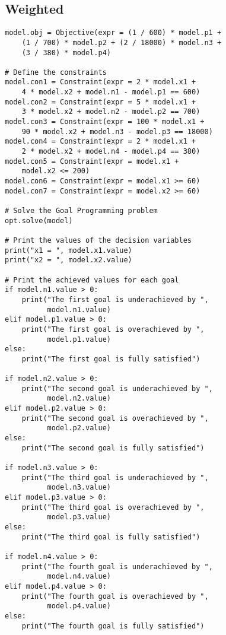 \documentclass[twoside,twocolumn]{article}
\begin{document}
\subsection{Weighted}

\blindtext %

\begin{lstlisting}
model.obj = Objective(expr = (1 / 600) * model.p1 +
    (1 / 700) * model.p2 + (2 / 18000) * model.n3 +
    (3 / 380) * model.p4)

# Define the constraints
model.con1 = Constraint(expr = 2 * model.x1 +
    4 * model.x2 + model.n1 - model.p1 == 600)
model.con2 = Constraint(expr = 5 * model.x1 +
    3 * model.x2 + model.n2 - model.p2 == 700)
model.con3 = Constraint(expr = 100 * model.x1 +
    90 * model.x2 + model.n3 - model.p3 == 18000)
model.con4 = Constraint(expr = 2 * model.x1 +
    2 * model.x2 + model.n4 - model.p4 == 380)
model.con5 = Constraint(expr = model.x1 +
    model.x2 <= 200)
model.con6 = Constraint(expr = model.x1 >= 60)
model.con7 = Constraint(expr = model.x2 >= 60)

# Solve the Goal Programming problem
opt.solve(model)

# Print the values of the decision variables
print("x1 = ", model.x1.value)
print("x2 = ", model.x2.value)

# Print the achieved values for each goal
if model.n1.value > 0:
    print("The first goal is underachieved by ",
          model.n1.value)
elif model.p1.value > 0:
    print("The first goal is overachieved by ",
          model.p1.value)
else:
    print("The first goal is fully satisfied")

if model.n2.value > 0:
    print("The second goal is underachieved by ",
          model.n2.value)
elif model.p2.value > 0:
    print("The second goal is overachieved by ",
          model.p2.value)
else:
    print("The second goal is fully satisfied")

if model.n3.value > 0:
    print("The third goal is underachieved by ",
          model.n3.value)
elif model.p3.value > 0:
    print("The third goal is overachieved by ",
          model.p3.value)
else:
    print("The third goal is fully satisfied")

if model.n4.value > 0:
    print("The fourth goal is underachieved by ",
          model.n4.value)
elif model.p4.value > 0:
    print("The fourth goal is overachieved by ",
          model.p4.value)
else:
    print("The fourth goal is fully satisfied")
\end{lstlisting}
\end{document}
